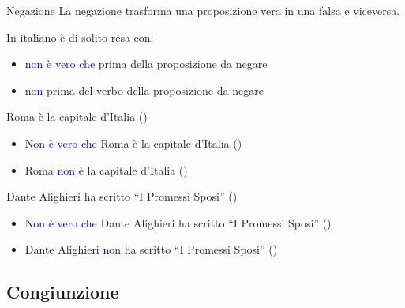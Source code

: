 \documentclass[aspectratio=169,10pt]{beamer}
\newcommand{\xmark}{{\color{red}{\ding{55}}}}
\newcommand{\conn}[1]{\textcolor{blue}{#1}}
\begin{document}
\begin{frame}{Negazione}
    La \alert{negazione} trasforma una proposizione vera in una falsa e viceversa.
    \medskip

    In italiano è di solito resa con:
    \begin{itemize}
        \item \conn{non è vero che} prima della proposizione da negare
        \item \conn{non} prima del verbo della proposizione da negare
    \end{itemize}
    \begin{example}
        Roma è la capitale d'Italia (\checkmark) \pause
        \begin{itemize}
            \item \conn{Non è vero che} Roma è la capitale d'Italia (\xmark)
            \item  Roma \conn{non} è la capitale d'Italia (\xmark)
        \end{itemize}
        \medskip

        \pause
        Dante Alighieri ha scritto ``I Promessi Sposi'' (\xmark) \pause
        \begin{itemize}
            \item \conn{Non è vero che} Dante Alighieri ha scritto ``I Promessi Sposi'' (\checkmark)
            \item  Dante Alighieri \conn{non} ha scritto ``I Promessi Sposi'' (\checkmark)
        \end{itemize}
    \end{example}
\end{frame}

\subsection{Congiunzione}
\end{document}
